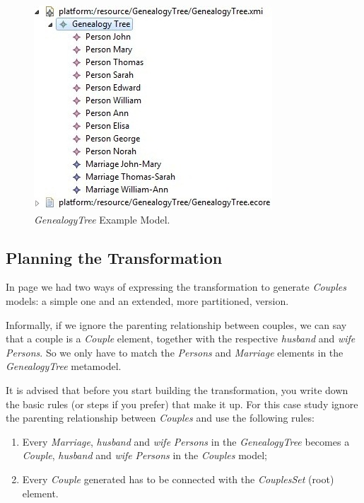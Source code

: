 \begin{figure}[h]
\begin{center}
  \includegraphics[scale=0.7]{imgs/genealogical_tree_example_model.jpg}
  \caption{\emph{GenealogyTree} Example Model.}
  \label{fig:genealogical_tree_example_model}
\end{center}
\end{figure}

\clearpage

\subsection{Planning the Transformation}

In page \pageref{subsubsec:metaphor} we had two ways of expressing the
transformation to generate \emph{Couples} models: a simple one and an extended,
more partitioned, version.

Informally, if we ignore the parenting relationship between couples, we can say
that a couple is a \emph{Couple} element, together with
the respective \emph{husband} and \emph{wife} \emph{Persons}. So we only have to
match the
\emph{Persons} and \emph{Marriage} elements in the \emph{GenealogyTree}
metamodel.

It is advised that before you start building the transformation, you write down
the basic rules (or steps if you prefer) that make it up. For this case study
ignore the parenting relationship between \emph{Couples} and use the following
rules:

\begin{enumerate}
  \item Every \emph{Marriage}, \emph{husband} and \emph{wife} \emph{Persons} in
  the \emph{GenealogyTree} becomes a \emph{Couple}, \emph{husband} and
  \emph{wife} \emph{Persons} in the \emph{Couples} model;
  \item Every \emph{Couple} generated has to be connected with the
  \emph{CouplesSet} (root) element.
\end{enumerate}

